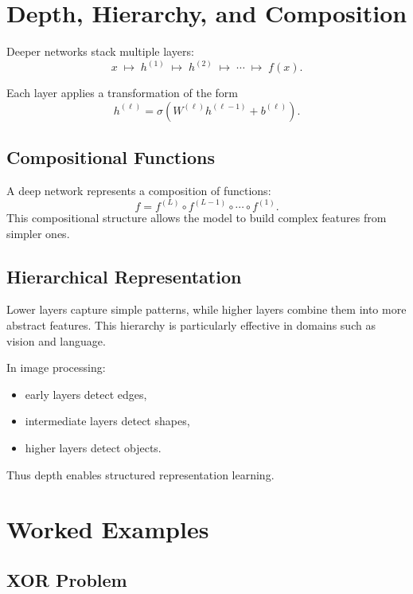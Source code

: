\section{Depth, Hierarchy, and Composition}

Deeper networks stack multiple layers:
\[
x \;\mapsto\; h^{(1)} \;\mapsto\; h^{(2)} \;\mapsto\; \cdots \;\mapsto\; f(x).
\]

Each layer applies a transformation of the form
\[
h^{(\ell)} = \sigma(W^{(\ell)} h^{(\ell-1)} + b^{(\ell)}).
\]

\subsection{Compositional Functions}

A deep network represents a composition of functions:
\[
f = f^{(L)} \circ f^{(L-1)} \circ \cdots \circ f^{(1)}.
\]
This compositional structure allows the model to build complex features from simpler ones.

\subsection{Hierarchical Representation}

Lower layers capture simple patterns, while higher layers combine them into more abstract features. This hierarchy is particularly effective in domains such as vision and language.

\begin{example}
In image processing:
\begin{itemize}
    \item early layers detect edges,
    \item intermediate layers detect shapes,
    \item higher layers detect objects.
\end{itemize}
\end{example}

Thus depth enables structured representation learning.

\section{Worked Examples}

\subsection{XOR Problem}

